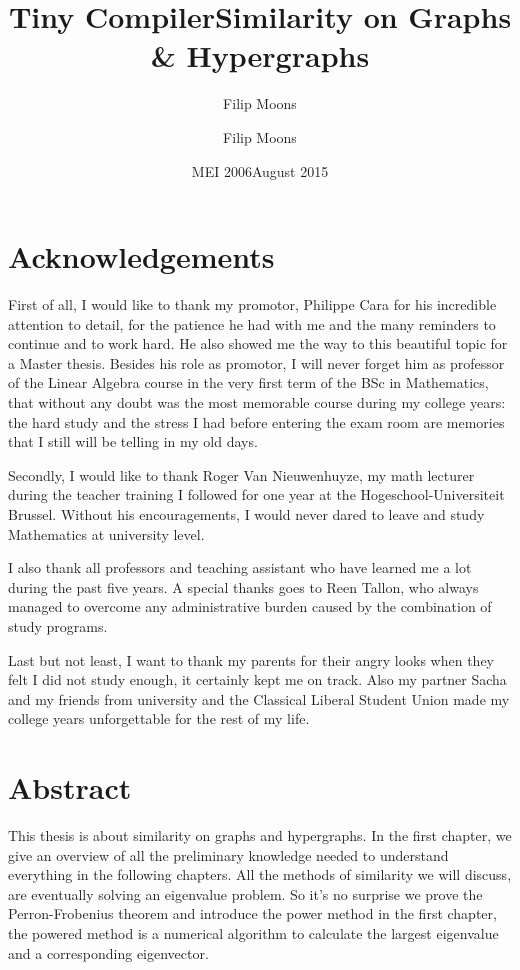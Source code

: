 \documentclass[a4paper,11pt]{report}
\author{Filip Moons}
\title{Tiny Compiler}
\author{Filip Moons}
\title{Similarity on Graphs \& Hypergraphs}
\date{MEI 2006}
\date{August 2015}
\begin{document}
\maketitlepage
\chapter*{Acknowledgements}
First of all, I would like to thank my promotor, Philippe Cara for his incredible attention to detail, 
for the patience he had with me and the many reminders to continue and to work 
hard. He also showed me the way to this beautiful topic for a Master thesis. Besides his role as 
promotor, I will never forget him as professor of the Linear Algebra course in 
the very first term of the BSc in Mathematics, that without any doubt was the 
most memorable course during my college years: the hard study and the stress I 
had before entering the exam room are memories that I still will be telling in my 
old days.

Secondly, I would like to thank Roger Van Nieuwenhuyze, my math lecturer during 
the teacher training I followed for one year at the Hogeschool-Universiteit Brussel. Without his encouragements, I would never dared to leave
and study Mathematics at university level. 

I also thank all professors and teaching assistant who have learned me a 
lot during the past five years. A special thanks goes to Reen Tallon, who 
always managed to overcome any administrative burden caused by the combination 
of study programs.

Last but not least, I want to thank my parents for their angry looks when they 
felt I did not study enough, it certainly kept me on track. Also my partner Sacha and my friends from university and the Classical Liberal Student  
Union made my college years unforgettable for the rest of my life.


 
\chapter*{Abstract}
This thesis is about similarity on graphs and hypergraphs. In the first chapter, 
we give an overview of all the preliminary knowledge needed to understand 
everything in the following chapters. All the methods of similarity we will 
discuss, are eventually solving an eigenvalue problem. So it's no surprise we 
prove the Perron-Frobenius theorem and introduce the power method in the first 
chapter, the powered method is a numerical algorithm to calculate the largest 
eigenvalue and a corresponding eigenvector.
\end{document}
